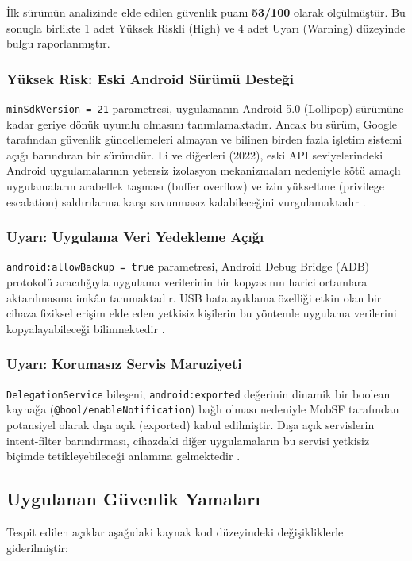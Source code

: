 İlk sürümün analizinde elde edilen güvenlik puanı \textbf{53/100} olarak ölçülmüştür. Bu sonuçla birlikte 1 adet Yüksek Riskli (High) ve 4 adet Uyarı (Warning) düzeyinde bulgu raporlanmıştır.

\subsubsection{Yüksek Risk: Eski Android Sürümü Desteği}
\texttt{minSdkVersion = 21} parametresi, uygulamanın Android 5.0 (Lollipop) sürümüne kadar geriye dönük uyumlu olmasını tanımlamaktadır. Ancak bu sürüm, Google tarafından güvenlik güncellemeleri almayan ve bilinen birden fazla işletim sistemi açığı barındıran bir sürümdür. Li ve diğerleri (2022), eski API seviyelerindeki Android uygulamalarının yetersiz izolasyon mekanizmaları nedeniyle kötü amaçlı uygulamaların arabellek taşması (buffer overflow) ve izin yükseltme (privilege escalation) saldırılarına karşı savunmasız kalabileceğini vurgulamaktadır \cite{li2022android}.

\subsubsection{Uyarı: Uygulama Veri Yedekleme Açığı}
\texttt{android:allowBackup = true} parametresi, Android Debug Bridge (ADB) protokolü aracılığıyla uygulama verilerinin bir kopyasının harici ortamlara aktarılmasına imkân tanımaktadır. USB hata ayıklama özelliği etkin olan bir cihaza fiziksel erişim elde eden yetkisiz kişilerin bu yöntemle uygulama verilerini kopyalayabileceği bilinmektedir \cite{owasp2023mobile}.

\subsubsection{Uyarı: Korumasız Servis Maruziyeti}
\texttt{DelegationService} bileşeni, \texttt{android:exported} değerinin dinamik bir boolean kaynağa (\texttt{@bool/enableNotification}) bağlı olması nedeniyle MobSF tarafından potansiyel olarak dışa açık (exported) kabul edilmiştir. Dışa açık servislerin intent-filter barındırması, cihazdaki diğer uygulamaların bu servisi yetkisiz biçimde tetikleyebileceği anlamına gelmektedir \cite{enck2014taintdroid}.

\subsection{Uygulanan Güvenlik Yamaları}

Tespit edilen açıklar aşağıdaki kaynak kod düzeyindeki değişikliklerle giderilmiştir:

